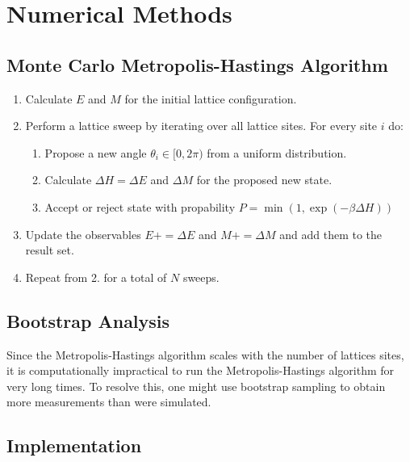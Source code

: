 \section{Numerical Methods}
\subsection{Monte Carlo Metropolis-Hastings Algorithm}\label{sec:metropolis_hastings}

\begin{enumerate}
	\item Calculate $E$ and $M$ for the initial lattice configuration.
	\item Perform a lattice sweep by iterating over all lattice sites. For every site $i$ do:
	\begin{enumerate}
		\item Propose a new angle $\theta_i \in [0,2\pi)$ from a uniform distribution.
		\item Calculate $\Delta H = \Delta E$ and $\Delta M$ for the proposed new state.
		\item Accept or reject state with propability $P = \min{(1, \exp{(-\beta\Delta H)})}$
	\end{enumerate}
	\item Update the observables $E \mathrel{{+}{=}} \Delta E$ and $M \mathrel{{+}{=}} \Delta M$ and add them to the result set.
	\item Repeat from 2. for a total of $N$ sweeps.
\end{enumerate}

\subsection{Bootstrap Analysis}\label{sec:bootstrap}
Since the Metropolis-Hastings algorithm scales with the number of lattices sites, it is computationally impractical to run the Metropolis-Hastings algorithm for very long times. To resolve this, one might use bootstrap sampling to obtain more measurements than were simulated. 

\subsection{Implementation}
